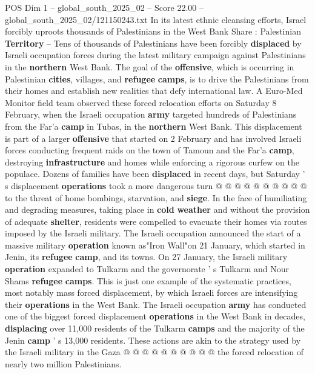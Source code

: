 \begin{textsample}{POS Dim 1 – global\_south\_2025\_02 – Score 22.00 – global\_south\_2025\_02/121150243.txt}  \label{ex:f1_pos_417}
In its latest ethnic cleansing efforts, Israel forcibly uproots thousands of Palestinians in the West Bank Share : Palestinian \textbf{Territory} -- Tens of thousands of Palestinians have been forcibly \textbf{displaced} by Israeli occupation forces during the latest military campaign against Palestinians in the \textbf{northern} West Bank.
The goal of the \textbf{offensive}, which is occurring in Palestinian \textbf{cities}, villages, and \textbf{refugee} \textbf{camps}, is to drive the Palestinians from their homes and establish new realities that defy international law.
A Euro-Med Monitor field team observed these forced relocation efforts on Saturday 8 February, when the Israeli occupation \textbf{army} targeted hundreds of Palestinians from the Far'a \textbf{camp} in Tubas, in the \textbf{northern} West Bank.
This displacement is part of a larger \textbf{offensive} that started on 2 February and has involved Israeli forces conducting frequent raids on the town of Tamoun and the Far'a \textbf{camp}, destroying \textbf{infrastructure} and homes while enforcing a rigorous curfew on the populace.
Dozens of families have been \textbf{displaced} in recent days, but Saturday ' s displacement \textbf{operations} took a more dangerous turn @ @ @ @ @ @ @ @ @ @ to the threat of home bombings, starvation, and \textbf{siege}.
In the face of humiliating and degrading measures, taking place in \textbf{cold} \textbf{weather} and without the provision of adequate \textbf{shelter}, residents were compelled to evacuate their homes via routes imposed by the Israeli military.
The Israeli occupation announced the start of a massive military \textbf{operation} known as"Iron Wall"on 21 January, which started in Jenin, its \textbf{refugee} \textbf{camp}, and its towns.
On 27 January, the Israeli military \textbf{operation} expanded to Tulkarm and the governorate ' s Tulkarm and Nour Shams \textbf{refugee} \textbf{camps}.
This is just one example of the systematic practices, most notably mass forced displacement, by which Israeli forces are intensifying their \textbf{operations} in the West Bank.
The Israeli occupation \textbf{army} has conducted one of the biggest forced displacement \textbf{operations} in the West Bank in decades, \textbf{displacing} over 11,000 residents of the Tulkarm \textbf{camps} and the majority of the Jenin \textbf{camp} ' s 13,000 residents.
These actions are akin to the strategy used by the Israeli military in the Gaza @ @ @ @ @ @ @ @ @ @ the forced relocation of nearly two million Palestinians.

\end{textsample}
